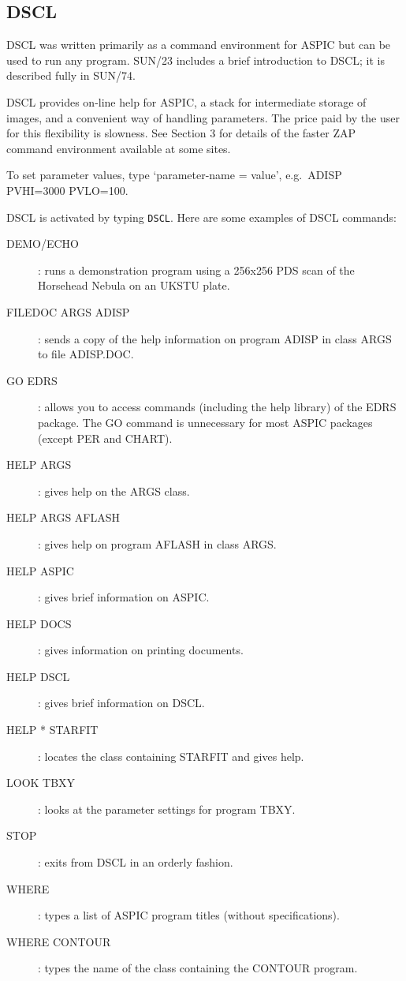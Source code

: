 \subsection {DSCL}
DSCL was written primarily as a command environment for ASPIC but can be used
to run any program.
SUN/23 includes a brief introduction to DSCL; it is  described fully in SUN/74.

DSCL provides on-line help for ASPIC, a stack for intermediate storage of
images, and a convenient way of handling parameters.
The price paid by the user for this flexibility is slowness.
See Section 3 for details of the faster ZAP command environment
available at some sites.

To set parameter values, type `parameter-name = value', e.g.\ ADISP PVHI=3000
PVLO=100.

DSCL is activated by typing {\tt DSCL}.
Here are some examples of DSCL commands:
\begin{description}
\item[DEMO/ECHO]:
runs a demonstration program using a 256x256 PDS scan of the Horsehead Nebula
on an UKSTU plate.
\item[FILEDOC ARGS ADISP]:
sends a copy of the help information on program ADISP in class ARGS to file
ADISP.DOC.
\item[GO EDRS]:
allows you to access commands (including the help library) of the EDRS package.
The GO command is unnecessary for most ASPIC packages (except PER and CHART).
\item[HELP ARGS]:
gives help on the ARGS class.
\item[HELP ARGS AFLASH]:
gives help on program AFLASH in class ARGS.
\item[HELP ASPIC]:
gives brief information on ASPIC.
\item[HELP DOCS]:
gives information on printing documents.
\item[HELP DSCL]:
gives brief information on DSCL.
\item[HELP * STARFIT]:
locates the class containing STARFIT and gives help.
\item[LOOK TBXY]:
looks at the parameter settings for program TBXY.
\item[STOP]:
exits from DSCL in an orderly fashion.
\item[WHERE]:
types a list of ASPIC program titles (without specifications).
\item[WHERE CONTOUR]:
types the name of the class containing the CONTOUR program.
\end{description}

